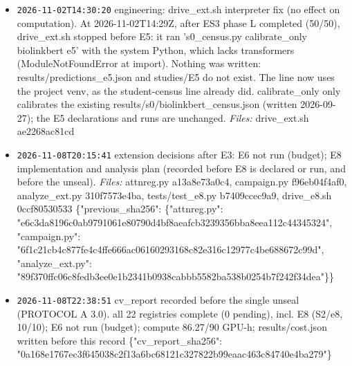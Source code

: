 \documentclass[11pt]{article}
\begin{document}
\begin{itemize}
\item \texttt{2026-11-02T14:30:20} engineering: drive\_ext.sh interpreter fix (no effect on computation). At 2026-11-02T14:29Z, after ES3 phase L completed (50/50), drive\_ext.sh stopped before E5: it ran 's0\_census.py calibrate\_only biolinkbert e5' with the system Python, which lacks transformers (ModuleNotFoundError at import). Nothing was written: results/predictions\_e5.json and studies/E5 do not exist. The line now uses the project venv, as the student-census line already did. calibrate\_only only calibrates the existing results/s0/biolinkbert\_census.json (written 2026-09-27); the E5 declarations and runs are unchanged. \emph{Files:} drive\_ext.sh ae2268ac81cd
\item \texttt{2026-11-08T20:15:41} extension decisions after E3: E6 not run (budget); E8 implementation and analysis plan (recorded before E8 is declared or run, and before the unseal).  \emph{Files:} attnreg.py a13a8e73a0c4, campaign.py f96eb04f4af0, analyze\_ext.py 310f7573e4ba, tests/test\_e8.py b7409ccec9a9, drive\_e8.sh 0ccf80530533 \{"previous\_sha256": \{"attnreg.py": "e6c3da8196c0ab9791061e80790d4bf8aeafcb3239356bba8eea112c44345324", "campaign.py": "6f1c21cb4c877fe4c4ffe666ac06160293168c82e316c12977c4be688672c99d", "analyze\_ext.py": "89f370ffc06c8fedb3ee0e1b2341b0938cabbb5582ba538b0254b7f242f34dea"\}\}
\item \texttt{2026-11-08T22:38:51} cv\_report recorded before the single unseal (PROTOCOL A 3.0). all 22 registries complete (0 pending), incl. E8 (S2/e8, 10/10); E6 not run (budget); compute 86.27/90 GPU-h; results/cost.json written before this record \{"cv\_report\_sha256": "0a168e1767ec3f645038c2f13a6bc68121c327822b99eaac463c84740e4ba279"\}
\end{itemize}
\end{document}
